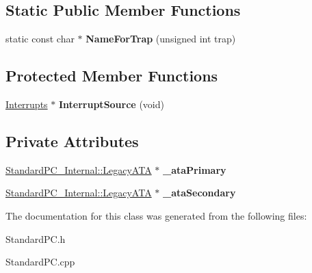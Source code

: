 \subsection*{Static Public Member Functions}
\begin{DoxyCompactItemize}
\item 
\mbox{\label{class_standard_p_c_a99ed95f8aff1e21364481a00c82048a7}} 
static const char $\ast$ {\bfseries Name\+For\+Trap} (unsigned int trap)
\end{DoxyCompactItemize}
\subsection*{Protected Member Functions}
\begin{DoxyCompactItemize}
\item 
\mbox{\label{class_standard_p_c_a6c028c9f42c53bdd048cf25118518c87}} 
\hyperlink{class_interrupts}{Interrupts} $\ast$ {\bfseries Interrupt\+Source} (void)
\end{DoxyCompactItemize}
\subsection*{Private Attributes}
\begin{DoxyCompactItemize}
\item 
\mbox{\label{class_standard_p_c_a43f990522b10573a1028523e245cfa50}} 
\hyperlink{class_standard_p_c___internal_1_1_legacy_a_t_a}{Standard\+P\+C\+\_\+\+Internal\+::\+Legacy\+A\+TA} $\ast$ {\bfseries \+\_\+ata\+Primary}
\item 
\mbox{\label{class_standard_p_c_ad18d2ec0ab86a08c1a5f463e3f19bcb9}} 
\hyperlink{class_standard_p_c___internal_1_1_legacy_a_t_a}{Standard\+P\+C\+\_\+\+Internal\+::\+Legacy\+A\+TA} $\ast$ {\bfseries \+\_\+ata\+Secondary}
\end{DoxyCompactItemize}


The documentation for this class was generated from the following files\+:\begin{DoxyCompactItemize}
\item 
Standard\+P\+C.\+h\item 
Standard\+P\+C.\+cpp\end{DoxyCompactItemize}
